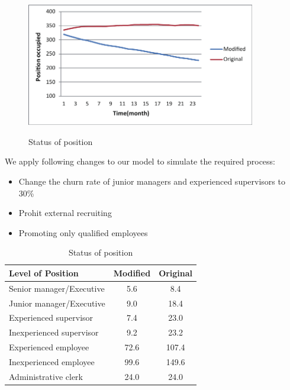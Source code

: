 \documentclass[12pt,a4paper,titlepage]{article}
\begin{document}
\begin{figure}[htb]
  \centering
  \includegraphics[width=10cm]{task5_p.pdf}\\
  \caption{Status of position}\label{t5_p}
\end{figure}
We apply following changes to our model to simulate the required process:\\
\begin{itemize}
\item Change the churn rate of junior managers and experienced supervisors to 30\%
\item Prohit external recruiting
\item Promoting only qualified employees
\end{itemize}
\begin{table}
        \begin{center}
                \begin{tabular}{l|cc}\toprule[2pt]
                \bfseries Level of Position & \bfseries Modified & \bfseries Original\\ \midrule
                Senior manager/Executive & 5.6 & 8.4\\
                Junior manager/Executive & 9.0 & 18.4\\
                Experienced supervisor & 7.4 & 23.0\\
                Inexperienced supervisor & 9.2 & 23.2\\
                Experienced employee & 72.6 & 107.4\\
                Inexperienced employee & 99.6 & 149.6\\
                Administrative clerk & 24.0 & 24.0\\ \bottomrule[2pt]
                \end{tabular}
                \caption{Status of position}\label{t5_p_t}
        \end{center}
\end{table}
\end{document}
